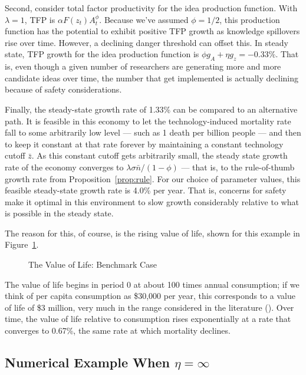 \documentclass[12pt,twoside]{article}
\newcommand{\cnp}[1]{(\citealt{#1})}  %
\begin{document}
Second, consider total factor productivity for the idea production
function. With $\lambda=1$, TFP is $\alpha F(z_t) A_t ^\phi$. Because
we've assumed $\phi=1/2$, this production function has the potential to
exhibit positive TFP growth as knowledge spillovers rise over time.
However, a declining danger threshold can offset this. In steady state,
TFP growth for the idea production function is $\phi g_A + \eta
g_z=-0.33\%$. That is, even though a given number of researchers are
generating more and more candidate ideas over time, the number that get
implemented is actually declining because of safety considerations.

Finally, the steady-state growth rate of 1.33\% can be compared to an
alternative path. It is feasible in this economy to let the
technology-induced mortality rate fall to some arbitrarily low level ---
such as 1 death per billion people --- and then to keep it constant at
that rate forever by maintaining a constant technology cutoff $\bar{z}$.
As this constant cutoff gets arbitrarily small, the steady state growth
rate of the economy converges to $\lambda \sigma \bar{n}/(1-\phi)$ ---
that is, to the rule-of-thumb growth rate from
Proposition~\ref{prop:rule}. For our choice of parameter values, this
feasible steady-state growth rate is 4.0\% per year. That is, concerns
for safety make it optimal in this environment to slow growth
considerably relative to what is possible in the steady state.

The reason for this, of course, is the rising value of life, shown for
this example in Figure~\ref{fig:v}.
\begin{figure}[tp]
\caption{The Value of Life: Benchmark Case}
\label{fig:v}
\end{figure} 
The value of life begins in period 0 at about 100 times annual
consumption; if we think of per capita consumption as \$30,000 per year,
this corresponds to a value of life of \$3 million, very much in the
range considered in the literature
\cnp{ViscusiAldy2003,AshenfelterGreenstone2004,MurphyTopel2005}. Over
time, the value of life relative to consumption rises exponentially at a
rate that converges to 0.67\%, the same rate at which mortality
declines.


\subsection{Numerical Example When $\eta=\infty$}
\end{document}

